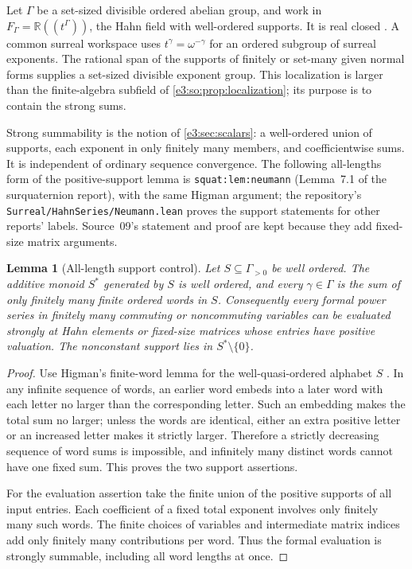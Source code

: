 \documentclass[11pt,letterpaper]{article}
\numberwithin{equation}{section}
\newtheorem{lemma}[lemma]{Lemma}
\theoremstyle{definition}
\theoremstyle{remark}
\newcommand{\R}{\mathbb R}
\begin{document}
Let \(\Gamma\) be a set-sized divisible ordered abelian group, and work in
\(F_\Gamma=\R((t^\Gamma))\), the Hahn field with well-ordered supports. It is
real closed \cite{vdDE,RepoQuaternion}. A common surreal workspace uses \(t^\gamma=\omega^{-\gamma}\)
for an ordered subgroup of surreal exponents. The rational span of the supports
of finitely or set-many given normal forms supplies a set-sized divisible
exponent group. This localization is larger than the finite-algebra subfield
of \cref{e3:so:prop:localization}; its purpose is to contain the strong sums.

Strong summability is the notion of \cref{e3:sec:scalars}: a well-ordered union
of supports, each exponent in only finitely many members, and coefficientwise
sums. It is independent of ordinary sequence convergence. The following
all-lengths form of the positive-support lemma is \texttt{squat:lem:neumann}
(Lemma~7.1 of the surquaternion report), with the same Higman argument; the
repository's \texttt{Surreal/HahnSeries/Neumann.lean} proves the
support statements for other reports' labels. Source~09's statement and proof
are kept because they add fixed-size matrix arguments.

\begin{lemma}[All-length support control]\label{e3:so:lem:neumann}
Let \(S\subseteq\Gamma_{>0}\) be well ordered. The additive monoid \(S^*\)
generated by \(S\) is well ordered, and every \(\gamma\in\Gamma\) is the sum of
only finitely many finite ordered words in \(S\). Consequently every formal
power series in finitely many commuting or noncommuting variables can be
evaluated strongly at Hahn elements or fixed-size matrices whose entries have
positive valuation. The nonconstant support lies in \(S^*\setminus\{0\}\).
\end{lemma}
\begin{proof}
Use Higman's finite-word lemma for the well-quasi-ordered alphabet \(S\)
\cite{Higman}. In any infinite sequence of words, an earlier word embeds into
a later word with each letter no larger than the corresponding letter.
Such an embedding makes the total sum no larger; unless the words are
identical, either an extra positive letter or an increased letter makes it
strictly larger. Therefore a strictly decreasing sequence of word sums is
impossible, and infinitely many distinct words cannot have one fixed sum.
This proves the two support assertions.

For the evaluation assertion take the finite union of the positive supports of
all input entries. Each coefficient of a fixed total exponent involves only
finitely many such words. The finite choices of variables and intermediate
matrix indices add only finitely many contributions per word. Thus the
formal evaluation is strongly summable, including all word lengths at once.
\end{proof}
\end{document}
